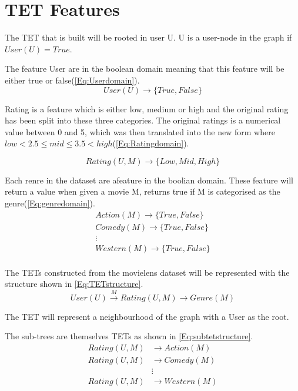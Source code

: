\section{TET Features}
The TET that is built will be rooted in user U.
U is a user-node in the graph if $User(U) = True$. 

The feature User are in the boolean domain meaning that this feature will be either true or false(\autoref{Eq:Userdomain}).
\begin{equation}\label{Eq:Userdomain}
User(U)\rightarrow \{True, False\}
\end{equation}

Rating is a feature which is either low, medium or high and the original rating has been split into these three categories.
The original ratings is a numerical value between 0 and 5, which was then translated into the new form where $low<2.5\leq mid \leq 3.5<high$(\autoref{Eq:Ratingdomain}).

\begin{equation}\label{Eq:Ratingdomain}
Rating(U, M) \rightarrow \{Low, Mid, High\}
\end{equation}

Each renre in the dataset are afeature in the boolian domain. These feature will return a value when given a movie M, returns true if M is categorised as the genre(\autoref{Eq:genredomain}).
\begin{equation}\label{Eq:genredomain}
\begin{aligned}
Action(M) \rightarrow \{True, False\} \\
Comedy(M) \rightarrow \{True, False\} \\
\vdots \\
Western(M) \rightarrow \{True, False\} \\
\end{aligned}
\end{equation}

The TETs constructed from the movielens dataset will be represented with the structure shown in \autoref{Eq:TETstructure}.
\begin{equation}\label{Eq:TETstructure}
User(U) \stackrel{M}{\longrightarrow} Rating(U,M) \longrightarrow Genre(M)
\end{equation}

The TET will represent a neighbourhood of the graph with a User as the root.

The sub-trees are themselves TETs as shown in \autoref{Eq:subtetstructure}.
\begin{equation}\label{Eq:subtetstructure}
\begin{aligned}
Rating(U,M)& \longrightarrow Action(M) \\
Rating(U,M)& \longrightarrow Comedy(M)\\
& \vdots \\
Rating(U,M)& \longrightarrow Western(M)
\end{aligned}	
\end{equation}

